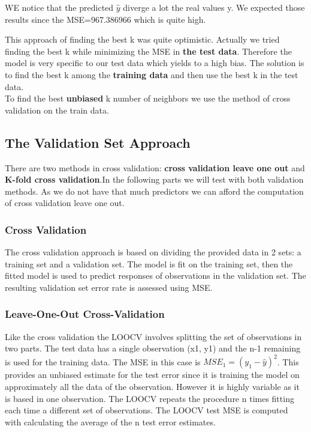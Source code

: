 \documentclass[]{report}
\begin{document}
WE notice that the predicted {$\hat{y}$} diverge a lot the real values y. We expected those results since the MSE=967.386966 which is quite high. 

This approach of finding the best k was quite optimistic. Actually we tried finding the best k while minimizing the MSE in \textbf{the test data}. Therefore the model is very specific to our test data which yields to a high bias. The solution is to find the best k among the \textbf{training data} and then use the best k in the test data. \\ To find the best \textbf{unbiased} k number of neighbors we use the method of cross validation on the train data. 

\subsection{The Validation Set Approach}
There are two methods in cross validation: \textbf{cross validation leave one out} and  \textbf{K-fold cross validation}.In the following parts we will test with both validation methods. As we do not have that much predictors we can afford the computation of cross validation leave one out.\\

\subsubsection{Cross Validation}
The cross validation approach is based on dividing the provided data in 2 sets: a training set and a validation set. The model is fit on the training set, then the fitted model is used to predict responses of observations in the validation set. The resulting validation set error rate is assessed using MSE.

\subsubsection{Leave-One-Out Cross-Validation}
Like the cross validation the LOOCV involves splitting the set of observations in two parts. The test data has a single observation (x1, y1) and the n-1 remaining is used for the training data. The MSE in this case is $MSE_1 =(y_1 - \hat{y})^{2}$. This provides an unbiased estimate for the test error since it is training the model on approximately all the data of the observation. However it is highly variable as it is based in one observation. The LOOCV repeats the procedure n times fitting each time a different set of observations. The LOOCV test MSE is computed with calculating the average of the n test error estimates.
  
\end{document}
